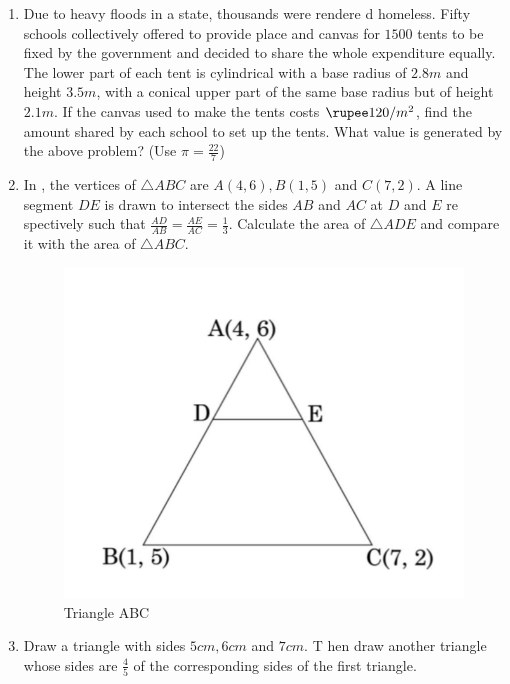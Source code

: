 \documentclass{article}                                         %
\begin{document}
\begin{enumerate}
    \item Due to heavy floods in a state, thousands were rendere
d homeless. Fifty schools collectively offered to provide place and canvas for $1500$ tents to be fixed by the government and decided to share the whole expenditure equally. The lower part of each tent is cylindrical with a base radius of $2.8 m$ and height $3.5 m$, with a conical upper part of the same base radius but of height $2.1 m$. If the canvas used to make the tents costs $\rupee 120/ m^2$, find the amount shared by each school to set up the tents. What value is generated by the above problem? (Use $\pi = \frac{22}{7} $)                                          
    \item In , the vertices of $\triangle ABC$ are $A(4, 6), B(1, 5)$ and $C(7, 2)$. A line segment $DE$ is drawn to intersect the sides $AB$ and $AC$ at $D$ and $E$ re
spectively such that $\frac{AD}{AB} = \frac{AE}{AC} = \frac{1}{3
}$. Calculate the area of $\triangle ADE$ and compare it with the area of $\triangle ABC$.                                          \begin{figure}[H]                                                   \includegraphics[width=\columnwidth]{./triangleABC.jpg}         \caption{Triangle ABC}                                          \label{fig:triangleABC}                                     \end{figure}

\item Draw a triangle with sides $5 cm, 6 cm$ and $7 cm$. T
    hen draw another triangle whose sides are $\frac{4}{5}$ of the
    corresponding sides of the first triangle.
								\end{enumerate}                                                 
\end{document}
